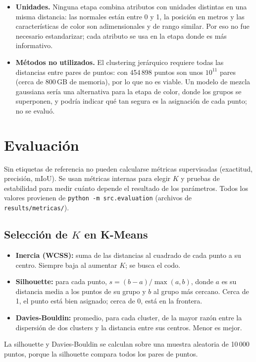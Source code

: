 \documentclass[11pt,a4paper]{article}
\begin{document}
\begin{itemize}
  \item \textbf{Unidades.} Ninguna etapa combina atributos con unidades
        distintas en una misma distancia: las normales están entre 0 y 1, la
        posición en metros y las características de color son adimensionales
        y de rango similar. Por eso no fue necesario estandarizar; cada
        atributo se usa en la etapa donde es más informativo.
  \item \textbf{Métodos no utilizados.} El clustering jerárquico requiere
        todas las distancias entre pares de puntos: con 454\,898 puntos son unos
        $10^{11}$ pares (cerca de 800\,GB de memoria), por lo que no es viable.
        Un modelo de mezcla gaussiana sería una alternativa para la etapa de
        color, donde los grupos se superponen, y podría indicar qué tan segura
        es la asignación de cada punto; no se evaluó.
\end{itemize}

\section{Evaluación}
\label{sec:evaluacion}
Sin etiquetas de referencia no pueden calcularse métricas supervisadas
(exactitud, precisión, mIoU). Se usan métricas internas para elegir $K$ y
pruebas de estabilidad para medir cuánto depende el resultado de los
parámetros. Todos los valores provienen de \texttt{python -m src.evaluation}
(archivos de \texttt{results/metricas/}).

\subsection{Selección de $K$ en K-Means}

\begin{itemize}
  \item \textbf{Inercia (WCSS):} suma de las distancias al cuadrado de cada
        punto a su centro. Siempre baja al aumentar $K$; se busca el codo.
  \item \textbf{Silhouette:} para cada punto,
        $s = (b - a)/\max(a, b)$, donde $a$ es su distancia media a los puntos
        de su grupo y $b$ al grupo más cercano. Cerca de 1, el punto está bien
        asignado; cerca de 0, está en la frontera.
  \item \textbf{Davies-Bouldin:} promedio, para cada cluster, de la mayor
        razón entre la dispersión de dos clusters y la distancia entre sus
        centros. Menor es mejor.
\end{itemize}
La silhouette y Davies-Bouldin se calculan sobre una muestra aleatoria de
10\,000 puntos, porque la silhouette compara todos los pares de puntos.
\end{document}
